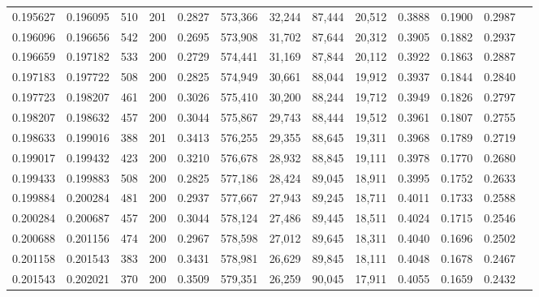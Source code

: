\begin{tabular}{rrrrrrrrrrrrr}
0.195627 & 0.196095 &   510 & 201 &                                     0.2827 & 573,366 &  32,244 &  87,444 &  20,512 & 0.3888 & 0.1900 & 0.2987 \\
0.196096 & 0.196656 &   542 & 200 &                                     0.2695 & 573,908 &  31,702 &  87,644 &  20,312 & 0.3905 & 0.1882 & 0.2937 \\
0.196659 & 0.197182 &   533 & 200 &                                     0.2729 & 574,441 &  31,169 &  87,844 &  20,112 & 0.3922 & 0.1863 & 0.2887 \\
0.197183 & 0.197722 &   508 & 200 &                                     0.2825 & 574,949 &  30,661 &  88,044 &  19,912 & 0.3937 & 0.1844 & 0.2840 \\
0.197723 & 0.198207 &   461 & 200 &                                     0.3026 & 575,410 &  30,200 &  88,244 &  19,712 & 0.3949 & 0.1826 & 0.2797 \\
0.198207 & 0.198632 &   457 & 200 &                                     0.3044 & 575,867 &  29,743 &  88,444 &  19,512 & 0.3961 & 0.1807 & 0.2755 \\
0.198633 & 0.199016 &   388 & 201 &                                     0.3413 & 576,255 &  29,355 &  88,645 &  19,311 & 0.3968 & 0.1789 & 0.2719 \\
0.199017 & 0.199432 &   423 & 200 &                                     0.3210 & 576,678 &  28,932 &  88,845 &  19,111 & 0.3978 & 0.1770 & 0.2680 \\
0.199433 & 0.199883 &   508 & 200 &                                     0.2825 & 577,186 &  28,424 &  89,045 &  18,911 & 0.3995 & 0.1752 & 0.2633 \\
0.199884 & 0.200284 &   481 & 200 &                                     0.2937 & 577,667 &  27,943 &  89,245 &  18,711 & 0.4011 & 0.1733 & 0.2588 \\
0.200284 & 0.200687 &   457 & 200 &                                     0.3044 & 578,124 &  27,486 &  89,445 &  18,511 & 0.4024 & 0.1715 & 0.2546 \\
0.200688 & 0.201156 &   474 & 200 &                                     0.2967 & 578,598 &  27,012 &  89,645 &  18,311 & 0.4040 & 0.1696 & 0.2502 \\
0.201158 & 0.201543 &   383 & 200 &                                     0.3431 & 578,981 &  26,629 &  89,845 &  18,111 & 0.4048 & 0.1678 & 0.2467 \\
0.201543 & 0.202021 &   370 & 200 &                                     0.3509 & 579,351 &  26,259 &  90,045 &  17,911 & 0.4055 & 0.1659 & 0.2432 \\

\end{tabular}
